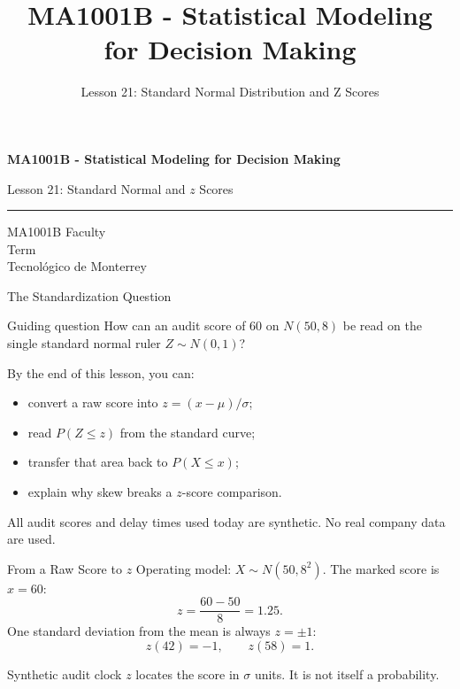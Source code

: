 \documentclass[aspectratio=169,10pt,english]{beamer}
\title{MA1001B - Statistical Modeling for Decision Making}
\subtitle{Lesson 21: Standard Normal Distribution and Z Scores}
\author{}
\institute{Tecnol\'ogico de Monterrey}
\date{}
\begin{document}
\begin{frame}[plain]
  \vspace{1.2cm}
  {\Large\bfseries MA1001B - Statistical Modeling for Decision Making\par}
  \vspace{0.7cm}
  {\large Lesson 21: Standard Normal and $z$ Scores\par}
  \vspace{0.7cm}
  {\color{TecRojo}\rule{\textwidth}{1.2pt}}
  \vspace{0.8cm}

  MA1001B Faculty\\[0.3cm]
  Term\\[0.3cm]
  Tecnol\'ogico de Monterrey
\end{frame}

\begin{frame}{The Standardization Question}
  \begin{alertblock}{Guiding question}
    How can an audit score of 60 on $N(50,8)$ be read on the single
    standard normal ruler $Z\sim N(0,1)$?
  \end{alertblock}

  \vspace{0.6em}
  By the end of this lesson, you can:
  \begin{itemize}
    \item convert a raw score into $z=(x-\mu)/\sigma$;
    \item read $P(Z\le z)$ from the standard curve;
    \item transfer that area back to $P(X\le x)$;
    \item explain why skew breaks a $z$-score comparison.
  \end{itemize}

  \vfill
  \scriptsize All audit scores and delay times used today are synthetic. No real company data are used.
\end{frame}

\begin{frame}{From a Raw Score to $z$}
  \small
  Operating model: $X\sim N(50,8^2)$. The marked score is $x=60$:
  \[
    z=\frac{60-50}{8}=1.25.
  \]
  One standard deviation from the mean is always $z=\pm 1$:
  \[
    z(42)=-1,\qquad z(58)=1.
  \]

  \vspace{0.3em}
  \begin{exampleblock}{Synthetic audit clock}
    $z$ locates the score in $\sigma$ units. It is not itself a probability.
  \end{exampleblock}
\end{frame}
\end{document}
